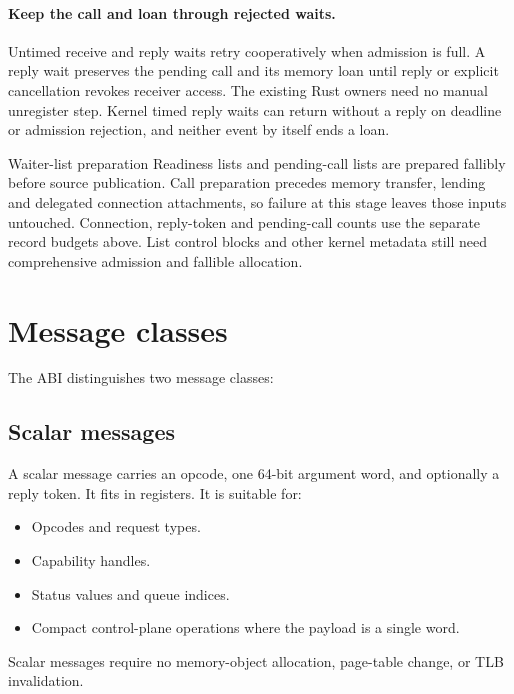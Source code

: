 \paragraph*{Keep the call and loan through rejected waits.}

Untimed receive and reply waits retry cooperatively when admission is full. A
reply wait preserves the pending call and its memory loan until reply or explicit
cancellation revokes receiver access. The existing Rust owners need no manual
unregister step. Kernel timed reply waits can return without a reply on deadline
or admission rejection, and neither event by itself ends a loan.

\begin{implementationdetail}{Waiter-list preparation}
Readiness lists and pending-call lists are prepared fallibly before source
publication. Call preparation precedes memory transfer, lending and delegated
connection attachments, so failure at this stage leaves those inputs untouched.
Connection, reply-token and pending-call counts use the separate record budgets
above. List control blocks and other kernel metadata still need comprehensive
admission and fallible allocation.
\end{implementationdetail}

\section{Message classes}

The ABI distinguishes two message classes:

\subsection{Scalar messages}

A scalar message carries an opcode, one 64-bit argument word, and optionally a
reply token. It fits in registers. It is suitable for:

\begin{itemize}
    \item Opcodes and request types.
    \item Capability handles.
    \item Status values and queue indices.
    \item Compact control-plane operations where the payload is a single word.
\end{itemize}

Scalar messages require no memory-object allocation, page-table change, or TLB
invalidation.


